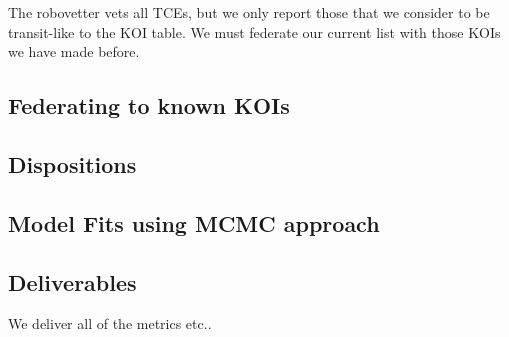 The robovetter vets all TCEs, but we only report those that we consider to be transit-like to the KOI table. We must federate our current list with those KOIs we have made before.
\subsection{Federating to known KOIs}
\label{koisec}

\subsection{Dispositions}

\subsection{Model Fits using MCMC approach}
\label{s:transitfits}

\subsection{Deliverables}
We deliver all of the metrics etc..

